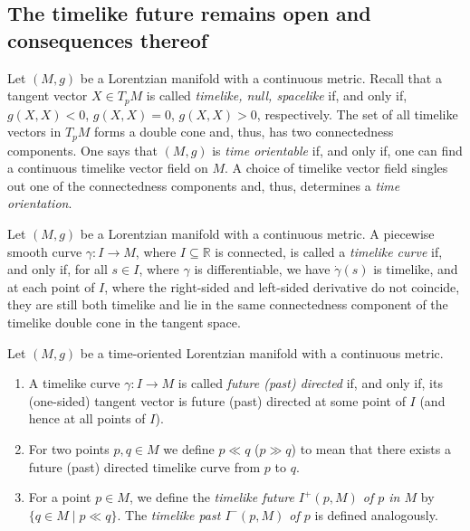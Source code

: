 \documentclass[reqno]{article}
\newcommand{\R}{\mathbb{R}}
\begin{document}
\subsection{The timelike future remains open and consequences thereof}

Let $(M,g)$ be a Lorentzian manifold with a continuous metric. Recall that a tangent vector $X \in T_pM$ is called \emph{timelike, null, spacelike} if, and only if,  $g(X,X) < 0$, $g(X,X) = 0$, $g(X,X) >0$, respectively. The set of all timelike vectors in $T_pM$ forms a double cone and, thus, has two connectedness components. One says that $(M,g)$ is \emph{time orientable} if, and only if, one can find a continuous timelike vector field on $M$. A choice of timelike vector field singles out one of the connectedness components and, thus, determines a \emph{time orientation}.

\begin{definition}\label{schwdef:timelike_curve}
Let $(M,g)$ be a Lorentzian manifold with a continuous metric. A piecewise smooth curve $\gamma : I \to M$, where $I \subseteq \R$ is connected, is called a \emph{timelike curve} if, and only if, for all $s \in I$, where $\gamma$ is differentiable, we have $\dot{\gamma}(s)$ is timelike, and at each point of $I$, where the right-sided and left-sided derivative do not coincide, they are still both timelike and lie in the same connectedness component of the timelike double cone in the tangent space. 
\end{definition}

\begin{definition}\label{schwdef:future_past_directed}
Let $(M,g)$ be a time-oriented Lorentzian manifold with a continuous metric.
\begin{enumerate}
\item A timelike curve $\gamma : I \to M$ is called \emph{future (past) directed} if, and only if, its (one-sided) tangent vector is future (past) directed at some point of $I$ (and hence at all points of $I$).
\item For two points $p,q \in M$ we define $p \ll q$ ($p \gg q$) to mean that there exists a future (past) directed timelike curve from $p$ to $q$.
\item For a point $p \in M$, we define the \emph{timelike future $I^+(p, M)$ of $p$ in $M$} by $\{ q \in M \; | \; p \ll q \}$. The \emph{timelike past $I^-(p, M)$ of $p$} is defined analogously.
\end{enumerate}
\end{definition}
\end{document}
